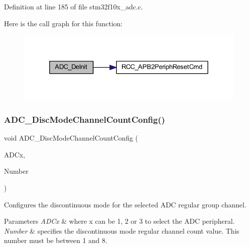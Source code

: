 Definition at line 185 of file stm32f10x\+\_\+adc.\+c.

Here is the call graph for this function\+:
\nopagebreak
\begin{figure}[H]
\begin{center}
\leavevmode
\includegraphics[width=324pt]{group___a_d_c___exported___functions_ga31fa6bc09de17125e9db2830ce77c09b_cgraph}
\end{center}
\end{figure}
\mbox{\label{group___a_d_c___exported___functions_ga6eb241ba82d67d1371136c9132083937}} 
\subsubsection{\texorpdfstring{A\+D\+C\+\_\+\+Disc\+Mode\+Channel\+Count\+Config()}{ADC\_DiscModeChannelCountConfig()}}
{\footnotesize\ttfamily void A\+D\+C\+\_\+\+Disc\+Mode\+Channel\+Count\+Config (\begin{DoxyParamCaption}\item[{\hyperlink{struct_a_d_c___type_def}{A\+D\+C\+\_\+\+Type\+Def} $\ast$}]{A\+D\+Cx,  }\item[{uint8\+\_\+t}]{Number }\end{DoxyParamCaption})}



Configures the discontinuous mode for the selected A\+DC regular group channel. 


\begin{DoxyParams}{Parameters}
{\em A\+D\+Cx} & where x can be 1, 2 or 3 to select the A\+DC peripheral. \\
\hline
{\em Number} & specifies the discontinuous mode regular channel count value. This number must be between 1 and 8. \\
\hline
\end{DoxyParams}

